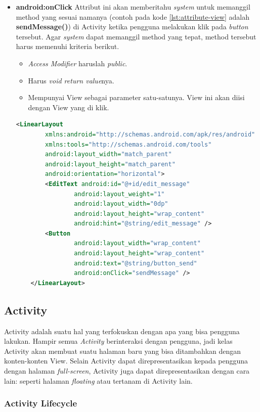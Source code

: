 \begin{itemize}
	\item \textbf{android:onClick}
	Attribut ini akan memberitahu \textit{system} untuk memanggil method yang sesuai namanya (contoh pada kode \ref{lst:attribute-view} adalah \textbf{sendMessage()}) di Activity ketika pengguna melakukan klik pada \textit{button} tersebut. Agar \textit{system} dapat memanggil method yang tepat, method tersebut harus memenuhi kriteria berikut.
	\begin{itemize}
		\item \textit{Access Modifier} haruslah \textit{public}.
		\item Harus \textit{void return value}nya.
		\item Mempunyai View sebagai parameter satu-satunya. View ini akan diisi dengan View yang di klik.
	\end{itemize}
\begin{lstlisting}[caption={Contoh kode file XML pada folder layout},label={lst:attribute-view},language=xml]
	<LinearLayout
		xmlns:android="http://schemas.android.com/apk/res/android"
		xmlns:tools="http://schemas.android.com/tools"
		android:layout_width="match_parent"
		android:layout_height="match_parent"
		android:orientation="horizontal">
		<EditText android:id="@+id/edit_message"
				android:layout_weight="1"
				android:layout_width="0dp"
				android:layout_height="wrap_content"
				android:hint="@string/edit_message" />
		<Button
				android:layout_width="wrap_content"
				android:layout_height="wrap_content"
				android:text="@string/button_send"
				android:onClick="sendMessage" />
	</LinearLayout>
\end{lstlisting}
\end{itemize}


\subsection{Activity}
\label{sec:activity}
Activity adalah suatu hal yang terfokuskan dengan apa yang bisa pengguna lakukan. Hampir semua \textit{Activity} berinteraksi dengan pengguna, jadi kelas Activity akan membuat suatu halaman baru yang bisa ditambahkan dengan konten-konten View. Selain Activity dapat direpresentasikan kepada pengguna dengan halaman \textit{full-screen}, Activity juga dapat direpresentasikan dengan cara lain: seperti halaman \textit{floating} atau tertanam di Activity lain.

\subsubsection{Activity Lifecycle}

